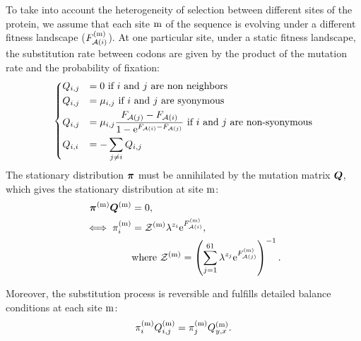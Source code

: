 To take into account the heterogeneity of selection between different sites of the protein, we assume that each site $\text{m}$ of the sequence is evolving under a different fitness landscape ($F_{\mathcal{A}({i})}^{(\text{m})}$).
At one particular site, under a static fitness landscape, the \gls{substitution} rate between \glspl{codon} are given by the product of the mutation rate and the probability of fixation:
\begin{equation}
    \begin{dcases}
        Q_{{i}, {j}} & = 0 \text{ if ${i}$ and ${j}$ are non neighbors} \\
        Q_{{i}, {j}} & = \mu_{{i}, {j}} \text{ if ${i}$ and ${j}$ are syonymous} \\
        Q_{{i}, {j}} & = \mu_{{i}, {j}} \dfrac{F_{\mathcal{A}({j})} - F_{\mathcal{A}({i})}}{1 - \mathrm{e}^{F_{\mathcal{A}({i})} - F_{\mathcal{A}({j})}} } \text{ if ${i}$ and ${j}$ are non-syonymous} \\
        Q_{{i}, {i}} & = - \sum\limits_{{j} \neq {i}} Q_{{i}, {j}}
    \end{dcases}
    \label{codonSubRates}
\end{equation}
The stationary distribution $ \bm{\pi}$ must be annihilated by the mutation matrix $\bm{Q}$, which gives the stationary distribution at site $\text{m}$:
\begin{align}
    \bm{\pi}^{(\text{m})} \bm{Q}^{(\text{m})}
    & = 0 ,\\
    \iff \pi_{{i}}^{(\text{m})}
    & = \mathcal{Z}^{(\text{m})} \lambda^{{z}_{{i}}} \mathrm{e}^{F_{\mathcal{A}({i})}^{(\text{m})}},\\
    & \mathrm{ where } \ \mathcal{Z}^{(\text{m})} = \left( \sum\limits_{{j}=1}^{61} \lambda^{{z}_{{j}}} \mathrm{e}^{F_{\mathcal{A}({j})}^{(\text{m})}} \right)^{-1}.
    \label{codonStationarity}
\end{align}

Moreover, the \gls{substitution} process is reversible and fulfills detailed balance conditions at each site $\text{m}$:
\begin{align}
    \pi_{{i}}^{(\text{m})} Q_{{i}, {j}}^{(\text{m})} = \pi_{{j}}^{(\text{m})} Q_{y, x}^{(\text{m})} .
    \label{codonSubBalance}
\end{align}

